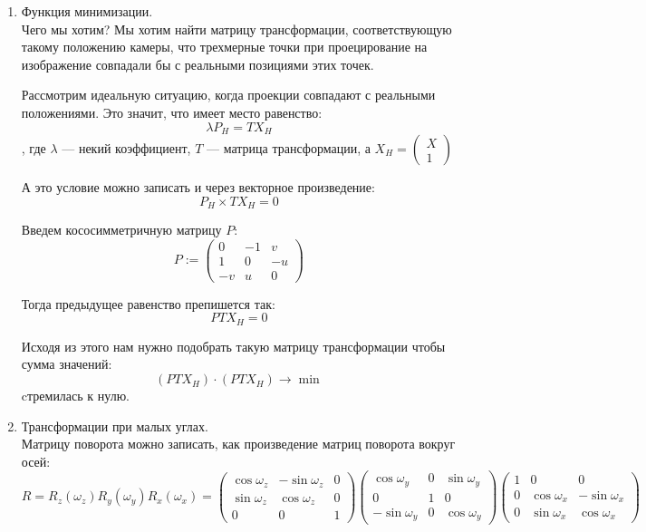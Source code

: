 \documentclass[12pt]{article}
\newenvironment{MyList}[1][4pt]{
  \begin{enumerate}[1.]
  \setlength{\parskip}{0pt}
  \setlength{\itemsep}{#1}
}{       
  \end{enumerate}
}
\begin{document}
\begin{MyList}
		\item{Функция минимизации.}\\
		Чего мы хотим? Мы хотим найти матрицу трансформации, соответствующую такому положению камеры, что трехмерные точки при проецирование на изображение совпадали бы с реальными позициями этих точек.
		
		Рассмотрим идеальную ситуацию, когда проекции совпадают с реальными положениями. Это значит, что имеет место равенство:
		$$\lambda P_H = T X_H$$
		, где $\lambda$ --- некий коэффициент, $T$ --- матрица трансформации, а $X_H =  \begin{pmatrix} 
		X \\\hline
		1
		\end{pmatrix}$
		
		А это условие можно записать и через векторное произведение:
		$$P_H \times T X_H = 0$$
		
		Введем кососимметричную матрицу $P$:
		$$P := \begin{pmatrix} 
		0 & -1 & v \\
		1 & 0 & -u \\
		-v & u & 0
		\end{pmatrix}$$
		
		Тогда предыдущее равенство препишется так:
		$$P T X_H = 0$$
		
		Исходя из этого нам нужно подобрать такую матрицу трансформации чтобы сумма значений:
		$$(P T X_H) \cdot (P T X_H) \rightarrow \min$$
		cтремилась к нулю.
		
		\item{Трансформации при малых углах.}\\
		Матрицу поворота можно записать, как произведение матриц поворота вокруг осей:
		$$R = R_z(\omega_z)R_y(\omega_y)R_x(\omega_x) = 
		\begin{pmatrix} 
		\cos{\omega_z} & -\sin{\omega_z} & 0 \\
		\sin{\omega_z} & \cos{\omega_z} & 0 \\
		0 & 0 & 1
		\end{pmatrix}
		\begin{pmatrix} 
		\cos{\omega_y} & 0 & \sin{\omega_y} \\
		0 & 1 & 0 \\
		-\sin{\omega_y} & 0 & \cos{\omega_y}
		\end{pmatrix}
		\begin{pmatrix} 
		1 & 0 & 0 \\
		0 & \cos{\omega_x} & -\sin{\omega_x} \\
		0 & \sin{\omega_x} & \cos{\omega_x}
		\end{pmatrix}$$
		

\end{MyList}
\end{document}
